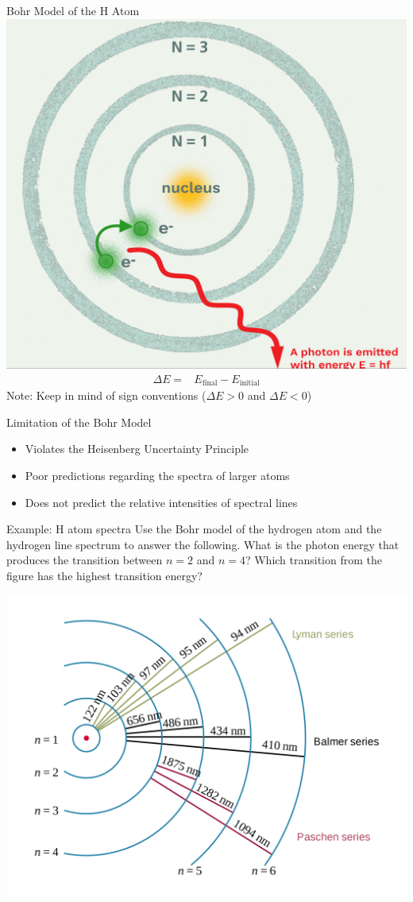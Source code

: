 \documentclass[11pt]{beamer}
\begin{document}
\begin{frame}{Bohr Model of the H Atom}
  \centering
  \includegraphics[width=0.55\linewidth]{bohr_model}
  \begin{align}
    \Delta E = & E_\text{final} - E_\text{initial}
  \end{align}
  Note: Keep in mind of sign conventions ($\Delta E > 0$ and
  $\Delta E < 0$)
\end{frame}

\begin{frame}{Limitation of the Bohr Model}
  \begin{itemize}
  \item Violates the Heisenberg Uncertainty Principle
  \item Poor predictions regarding the spectra of larger
    atoms
  \item Does not predict the relative intensities of spectral
    lines
  \end{itemize}
\end{frame}

\begin{frame}{Example: H atom spectra}
  Use the Bohr model of the hydrogen atom and the hydrogen
  line spectrum to answer the following. What is the photon energy
  that produces the transition between $n=2$ and $n=4$? Which transition
  from the figure has the highest transition energy?
  \begin{center}
    \includegraphics[scale=0.08]{h_spectra}
  \end{center}
\end{frame}
\end{document}

